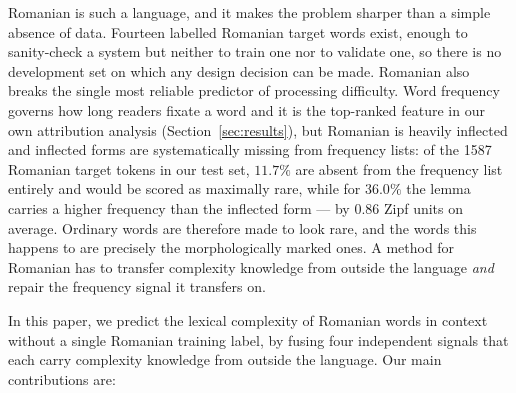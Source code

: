 \documentclass[11pt]{article}
\begin{document}
Romanian is such a language, and it makes the problem sharper than a
simple absence of data. Fourteen labelled Romanian target words exist,
enough to sanity-check a system but neither to train one nor to validate
one, so there is no development set on which any design decision can be
made. Romanian also breaks the single most reliable predictor of
processing difficulty. Word frequency governs how long readers fixate a
word \citep{rayner1998eye} and it is the top-ranked feature in our own
attribution analysis (Section~\ref{sec:results}), but Romanian is heavily
inflected and inflected forms are systematically missing from frequency
lists: of the 1587 Romanian target tokens in our test set, $11.7\%$ are
absent from the frequency list entirely and would be scored as maximally
rare, while for $36.0\%$ the lemma carries a higher frequency than the
inflected form --- by $0.86$ Zipf units on average. Ordinary words are
therefore made to look rare, and the words this happens to are precisely
the morphologically marked ones. A method for Romanian has to transfer
complexity knowledge from outside the language \emph{and} repair the
frequency signal it transfers on.

In this paper, we predict the lexical complexity of Romanian words in
context without a single Romanian training label, by fusing four
independent signals that each carry complexity knowledge from outside the
language. Our main contributions are:
\end{document}

